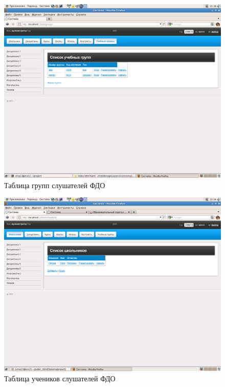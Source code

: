 \begin{figure}
\begin{center}
\includegraphics[scale=0.25]{image/groups.png}
\caption{Таблица групп слушателей ФДО}
\end{center}
\end{figure}


\begin{figure}
\begin{center}
\includegraphics[scale=0.25]{image/schoolers.png}
\caption{Таблица учеников слушателей ФДО}
\end{center}
\end{figure}

